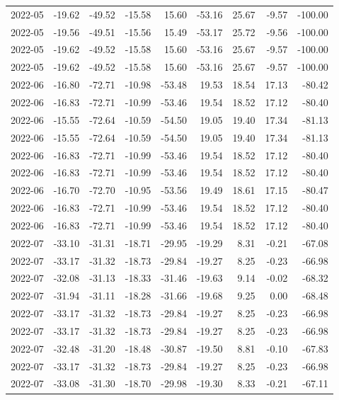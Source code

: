 \begin{table}[ht]
\begin{tabular}{lrrrrrrrr}
  2022-05 & -19.62 & -49.52 & -15.58 & 15.60 & -53.16 & 25.67 & -9.57 & -100.00 \\ 
  2022-05 & -19.56 & -49.51 & -15.56 & 15.49 & -53.17 & 25.72 & -9.56 & -100.00 \\ 
  2022-05 & -19.62 & -49.52 & -15.58 & 15.60 & -53.16 & 25.67 & -9.57 & -100.00 \\ 
  2022-05 & -19.62 & -49.52 & -15.58 & 15.60 & -53.16 & 25.67 & -9.57 & -100.00 \\ 
  2022-06 & -16.80 & -72.71 & -10.98 & -53.48 & 19.53 & 18.54 & 17.13 & -80.42 \\ 
  2022-06 & -16.83 & -72.71 & -10.99 & -53.46 & 19.54 & 18.52 & 17.12 & -80.40 \\ 
  2022-06 & -15.55 & -72.64 & -10.59 & -54.50 & 19.05 & 19.40 & 17.34 & -81.13 \\ 
  2022-06 & -15.55 & -72.64 & -10.59 & -54.50 & 19.05 & 19.40 & 17.34 & -81.13 \\ 
  2022-06 & -16.83 & -72.71 & -10.99 & -53.46 & 19.54 & 18.52 & 17.12 & -80.40 \\ 
  2022-06 & -16.83 & -72.71 & -10.99 & -53.46 & 19.54 & 18.52 & 17.12 & -80.40 \\ 
  2022-06 & -16.70 & -72.70 & -10.95 & -53.56 & 19.49 & 18.61 & 17.15 & -80.47 \\ 
  2022-06 & -16.83 & -72.71 & -10.99 & -53.46 & 19.54 & 18.52 & 17.12 & -80.40 \\ 
  2022-06 & -16.83 & -72.71 & -10.99 & -53.46 & 19.54 & 18.52 & 17.12 & -80.40 \\ 
  2022-07 & -33.10 & -31.31 & -18.71 & -29.95 & -19.29 & 8.31 & -0.21 & -67.08 \\ 
  2022-07 & -33.17 & -31.32 & -18.73 & -29.84 & -19.27 & 8.25 & -0.23 & -66.98 \\ 
  2022-07 & -32.08 & -31.13 & -18.33 & -31.46 & -19.63 & 9.14 & -0.02 & -68.32 \\ 
  2022-07 & -31.94 & -31.11 & -18.28 & -31.66 & -19.68 & 9.25 & 0.00 & -68.48 \\ 
  2022-07 & -33.17 & -31.32 & -18.73 & -29.84 & -19.27 & 8.25 & -0.23 & -66.98 \\ 
  2022-07 & -33.17 & -31.32 & -18.73 & -29.84 & -19.27 & 8.25 & -0.23 & -66.98 \\ 
  2022-07 & -32.48 & -31.20 & -18.48 & -30.87 & -19.50 & 8.81 & -0.10 & -67.83 \\ 
  2022-07 & -33.17 & -31.32 & -18.73 & -29.84 & -19.27 & 8.25 & -0.23 & -66.98 \\ 
  2022-07 & -33.08 & -31.30 & -18.70 & -29.98 & -19.30 & 8.33 & -0.21 & -67.11 \\ 

\end{tabular}
\end{table}
